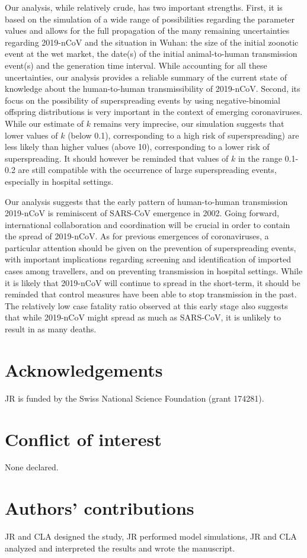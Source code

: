 \documentclass{article}
\begin{document}
Our analysis, while relatively crude, has two important strengths.
First, it is based on the simulation of a wide range of possibilities regarding the parameter values and allows for the full propagation of the many remaining uncertainties regarding 2019-nCoV and the situation in Wuhan: the size of the initial zoonotic event at the wet market, the date(s) of the initial animal-to-human transmission event(s) and the generation time interval.
While accounting for all these uncertainties, our analysis provides a reliable summary of the current state of knowledge about the human-to-human transmissibility of 2019-nCoV.
Second, its focus on the possibility of superspreading events by using negative-binomial offspring distributions is very important in the context of emerging coronaviruses.\cite{Lloyd-Smith:2005,Althaus:2015b}
While our estimate of $k$ remains very imprecise, our simulation suggests that lower values of $k$ (below 0.1), corresponding to a high risk of superspreading) are less likely than higher values (above 10), corresponding to a lower risk of superspreading.
It should however be reminded that values of $k$ in the range 0.1-0.2 are still compatible with the occurrence of large superspreading events, especially in hospital settings.\cite{oh2015middle,assiri2013hospital} 

Our analysis suggests that the early pattern of human-to-human transmission 2019-nCoV is reminiscent of SARS-CoV emergence in 2002.
Going forward, international collaboration and coordination will be crucial in order to contain the spread of 2019-nCoV.
As for previous emergences of coronaviruses, a particular attention should be given on the prevention of superspreading events, with important implications regarding screening and identification of imported cases among travellers, and on preventing transmission in hospital settings.
While it is likely that 2019-nCoV will continue to spread in the short-term, it should be reminded that control measures have been able to stop transmission in the past.
The relatively low case fatality ratio observed at this early stage also suggests that while 2019-nCoV might spread as much as SARS-CoV, it is unlikely to result in as many deaths.


\section{Acknowledgements}
JR is funded by the Swiss National Science Foundation (grant 174281).
\section{Conflict of interest}
None declared.

\section{Authors' contributions}

JR and CLA designed the study, JR performed model simulations, JR and CLA analyzed and interpreted the results and wrote the manuscript.


  
\end{document}
